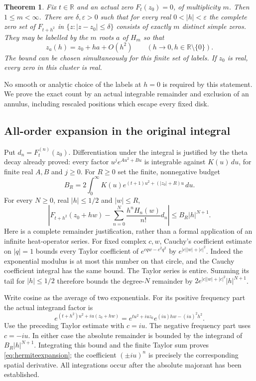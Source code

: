 \documentclass[11pt]{article}
\newtheorem{theorem}{Theorem}[section]
\newcommand{\R}{\mathbb R}\newcommand{\C}{\mathbb C}
\begin{document}
\begin{theorem}\label{thm:exactcluster}
Fix $t\in\R$ and an actual zero $F_t(z_0)=0$, of multiplicity $m$.
Then $1\leq m<\infty$. There are $\delta,\varepsilon>0$ such that
for every real $0<|h|<\varepsilon$ the complete zero set of
$F_{t+h^2}$ in $\{z:|z-z_0|\leq\delta\}$ consists of exactly $m$
distinct simple zeros. They may be labelled by the $m$ roots $a$ of
$H_m$ so that
\[
 z_a(h)=z_0+ha+O(h^2)\qquad(h\longrightarrow0, h\in\R\setminus\{0\}).
\]
The bound can be chosen simultaneously for this finite set of labels.
If $z_0$ is real, every zero in this cluster is real.
\end{theorem}
No smooth or analytic choice of the labels at $h=0$ is required by
this statement. We prove the exact count by an actual integrable
remainder and exclusion of an annulus, including rescaled positions
which escape every fixed disk.

\subsection*{All-order expansion in the original integral}
Put $d_n=F_t^{(n)}(z_0)$. Differentiation under the integral is justified
by the theta decay already proved: every factor $u^j e^{Au^2+Bu}$
is integrable against $K(u)\,du$, for finite real $A,B$ and $j\geq0$.
For $R\geq0$ set the finite, nonnegative budget
\[
 B_R=2\int_0^\infty K(u)
          e^{(t+1)u^2+(|z_0|+R)u}\,du.
\]
For every $N\geq0$, real $|h|\leq1/2$ and $|w|\leq R$,
\begin{equation}\label{eq:hermiteexpansion}
 \left|F_{t+h^2}(z_0+hw)
       -\sum_{n=0}^N\frac{h^nH_n(w)}{n!}d_n\right|
 \leq B_R|h|^{N+1}.
\end{equation}
Here is a complete remainder justification, rather than a formal
application of an infinite heat-operator series. For fixed complex
$c,w$, Cauchy's coefficient estimate on $|q|=1$ bounds every Taylor
coefficient of $e^{cqw-c^2q^2}$ by
$e^{|c||w|+|c|^2}$. Indeed the exponential modulus is at most this
number on that circle, and the Cauchy coefficient integral has the
same bound. The Taylor series is entire. Summing its tail for
$|h|\leq1/2$ therefore bounds the degree-$N$ remainder by
$2e^{|c||w|+|c|^2}|h|^{N+1}$.

Write cosine as the average of two exponentials. For its positive
frequency part the actual integrand factor is
\[
 e^{(t+h^2)u^2+iu(z_0+hw)}
 =e^{tu^2+iuz_0}e^{(iu)hw-(iu)^2h^2}.
\]
Use the preceding Taylor estimate with $c=iu$. The negative frequency
part uses $c=-iu$. In either case the absolute remainder is bounded
by the integrand of $B_R|h|^{N+1}$. Integrating this bound and the
finite Taylor sum proves \eqref{eq:hermiteexpansion}; the coefficient
$(\pm iu)^n$ is precisely the corresponding spatial derivative.
All integrations occur after the absolute majorant has been established.
\end{document}
